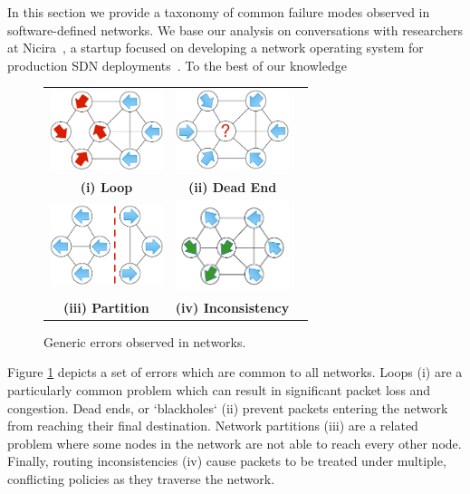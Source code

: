 
In this section we provide a taxonomy of common failure modes observed in
software-defined networks. We base our analysis on conversations with
researchers at Nicira~\cite{nicira}, a startup focused on developing a network operating
system for production SDN deployments~\cite{onix}. To the best of our
knowledge 

\begin{figure}[t]
    \centering
    \begin{tabular}{ccc}
    \hspace{-5pt}\includegraphics[width=1.3in]{../diagrams/bugs/loop.pdf}&
    \includegraphics[width=1.3in]{../diagrams/bugs/dead_end.pdf}& \\
    {\bf (i) Loop}&{\bf (ii) Dead End}& \\
    \includegraphics[width=1.3in]{../diagrams/bugs/partition.pdf}&
    \includegraphics[width=1.3in]{../diagrams/bugs/routing_inconsistency.pdf}\\
     {\bf (iii) Partition}&{\bf (iv) Inconsistency}
    \end{tabular}
    \caption[]{\label{fig:generic_errors} Generic errors observed in
    networks.\vspace{-10pt}} 
\end{figure}

Figure \ref{fig:generic_errors} depicts a set of errors which are
common to all networks. Loops (i) are a particularly common problem which
can result in significant packet loss and congestion. Dead ends, or
`blackholes` (ii) prevent packets entering the network from reaching their
final destination. Network partitions (iii) are a related problem where
some nodes in the network are not able to reach every other node. Finally, routing
inconsistencies (iv) cause packets to be treated under multiple, conflicting policies as
they traverse the network. 

